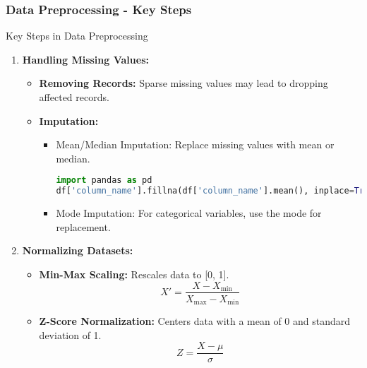 \documentclass[aspectratio=169]{beamer}
\begin{document}
\begin{frame}[fragile]
    \frametitle{Data Preprocessing - Key Steps}
    \begin{block}{Key Steps in Data Preprocessing}
        \begin{enumerate}
            \item \textbf{Handling Missing Values:}
                \begin{itemize}
                    \item \textbf{Removing Records:} Sparse missing values may lead to dropping affected records.  
                    \item \textbf{Imputation:} 
                    \begin{itemize}
                        \item Mean/Median Imputation: Replace missing values with mean or median.
                        \begin{lstlisting}[language=Python]
import pandas as pd
df['column_name'].fillna(df['column_name'].mean(), inplace=True)
                        \end{lstlisting}
                        \item Mode Imputation: For categorical variables, use the mode for replacement.
                    \end{itemize}
                \end{itemize}
            \item \textbf{Normalizing Datasets:}
                \begin{itemize}
                    \item \textbf{Min-Max Scaling:} Rescales data to [0, 1].
                    \begin{equation}
                    X' = \frac{X - X_{\text{min}}}{X_{\text{max}} - X_{\text{min}}}
                    \end{equation}
                    \item \textbf{Z-Score Normalization:} Centers data with a mean of 0 and standard deviation of 1.
                    \begin{equation}
                    Z = \frac{X - \mu}{\sigma}
                    \end{equation}
                \end{itemize}
        \end{enumerate}
    \end{block}
\end{frame}
\end{document}
